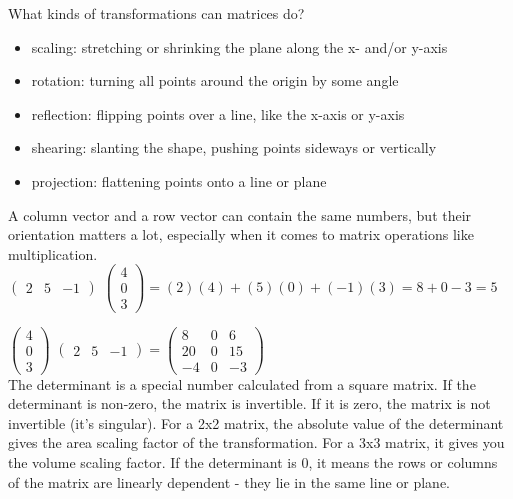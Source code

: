 \documentclass{article}
\begin{document}
What kinds of transformations can matrices do?
	\begin{itemize}
		\item scaling: stretching or shrinking the plane along the x- and/or y-axis
		\item rotation: turning all points around the origin by some angle
		\item reflection: flipping points over a line, like the x-axis or y-axis
		\item shearing: slanting the shape, pushing points sideways or vertically
		\item projection: flattening points onto a line or plane
	\end{itemize}

A column vector and a row vector can contain the same numbers, but their orientation matters a lot, especially when it comes to matrix operations like multiplication.\\

$
\begin{pmatrix}
2 & 5 & -1
\end{pmatrix}
$
$
\begin{pmatrix}
4\\
0\\
3
\end{pmatrix}
=
(2)(4) + (5)(0) + (-1)(3) = 8 + 0 - 3 = 5
$

$
\begin{pmatrix}
4\\
0\\
3
\end{pmatrix}
$
$
\begin{pmatrix}
2 & 5 & -1
\end{pmatrix}
=
\begin{pmatrix}
8 & 0 & 6\\
	20 & 0 & 15\\
-4 & 0 & -3
\end{pmatrix}
$\\

The determinant is a special number calculated from a square matrix. If the determinant is non-zero, the matrix is invertible. If it is zero, the matrix is not invertible (it's singular). For a 2x2 matrix, the absolute value of the determinant gives the area scaling factor of the transformation. For a 3x3 matrix, it gives you the volume scaling factor. If the determinant is 0, it means the rows or columns of the matrix are linearly dependent - they lie in the same line or plane.\\
\end{document}
